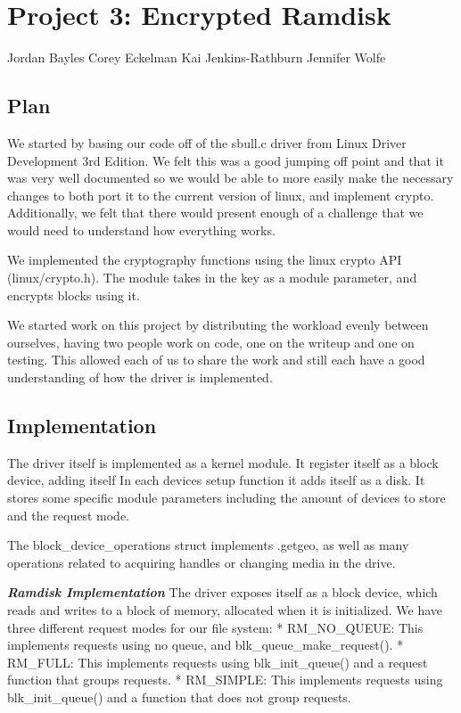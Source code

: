 \section{Project 3: Encrypted Ramdisk}

Jordan Bayles Corey Eckelman Kai Jenkins-Rathburn Jennifer Wolfe

\subsection{Plan}

We started by basing our code off of the sbull.c driver from Linux
Driver Development 3rd Edition. We felt this was a good jumping off
point and that it was very well documented so we would be able to more
easily make the necessary changes to both port it to the current version
of linux, and implement crypto. Additionally, we felt that there would
present enough of a challenge that we would need to understand how
everything works.

We implemented the cryptography functions using the linux crypto API
(linux/crypto.h). The module takes in the key as a module parameter, and
encrypts blocks using it.

We started work on this project by distributing the workload evenly
between ourselves, having two people work on code, one on the writeup
and one on testing. This allowed each of us to share the work and still
each have a good understanding of how the driver is implemented.

\subsection{Implementation}

The driver itself is implemented as a kernel module. It register itself
as a block device, adding itself In each devices setup function it adds
itself as a disk. It stores some specific module parameters including
the amount of devices to store and the request mode.

The block\_device\_operations struct implements .getgeo, as well as many
operations related to acquiring handles or changing media in the drive.

\textbf{\emph{Ramdisk Implementation}} The driver exposes itself as a
block device, which reads and writes to a block of memory, allocated
when it is initialized. We have three different request modes for our
file system: * RM\_NO\_QUEUE: This implements requests using no queue,
and blk\_queue\_make\_request(). * RM\_FULL: This implements requests
using blk\_init\_queue() and a request function that groups requests. *
RM\_SIMPLE: This implements requests using blk\_init\_queue() and a
function that does not group requests.


